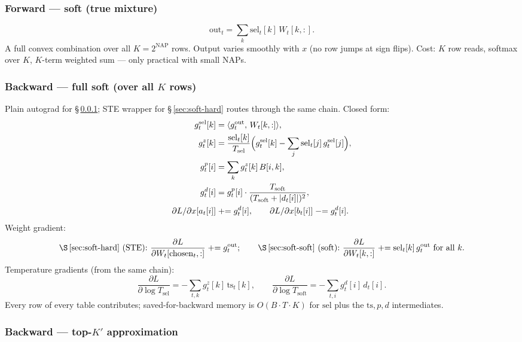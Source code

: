 \documentclass[11pt]{article}
\begin{document}
\subsubsection{Forward --- soft (true mixture)}\label{sec:soft-soft}
\[
  \text{out}_t = \sum_k \mathrm{sel}_t[k]\,W_t[k,:].
\]
A full convex combination over all $K=2^{\mathrm{NAP}}$ rows. Output varies
smoothly with $x$ (no row jumps at sign flips). Cost: $K$ row reads, softmax
over $K$, $K$-term weighted sum --- only practical with small NAPs.

\subsubsection{Backward --- full soft (over all $K$ rows)}\label{sec:soft-bwd}

Plain autograd for \S\,\ref{sec:soft-soft}; STE wrapper for \S\,\ref{sec:soft-hard}
routes through the same chain. Closed form:
\[
\begin{aligned}
  g_t^{\mathrm{sel}}[k] &= \langle g^{\mathrm{out}}_t,\,W_t[k,:]\rangle,\\
  g_t^{z}[k] &= \frac{\mathrm{sel}_t[k]}{T_{\mathrm{sel}}}\Bigl(g_t^{\mathrm{sel}}[k] - \sum_j \mathrm{sel}_t[j]\,g_t^{\mathrm{sel}}[j]\Bigr),\\
  g_t^{p}[i] &= \sum_k g_t^{z}[k]\,B[i,k],\\
  g_t^{d}[i] &= g_t^{p}[i]\cdot \frac{T_{\mathrm{soft}}}{(T_{\mathrm{soft}}+|d_t[i]|)^2},\\
  \partial L/\partial x[a_t[i]] &\mathrel{+}= g_t^{d}[i],\qquad
  \partial L/\partial x[b_t[i]] \mathrel{-}= g_t^{d}[i].
\end{aligned}
\]
Weight gradient:
\[
  \text{\S\,\ref{sec:soft-hard} (STE):}\ \frac{\partial L}{\partial W_t[\mathrm{chosen}_t,:]}\mathrel{+}=g^{\mathrm{out}}_t;\qquad
  \text{\S\,\ref{sec:soft-soft} (soft):}\ \frac{\partial L}{\partial W_t[k,:]}\mathrel{+}=\mathrm{sel}_t[k]\,g^{\mathrm{out}}_t\ \text{for all }k.
\]
Temperature gradients (from the same chain):
\[
  \frac{\partial L}{\partial \log T_{\mathrm{sel}}} = -\sum_{t,k} g_t^{z}[k]\,\mathrm{ts}_t[k],\qquad
  \frac{\partial L}{\partial \log T_{\mathrm{soft}}} = -\sum_{t,i} g_t^{d}[i]\,d_t[i].
\]
Every row of every table contributes; saved-for-backward memory is
$O(B\cdot T\cdot K)$ for $\mathrm{sel}$ plus the $\mathrm{ts},p,d$ intermediates.

\subsubsection{Backward --- top-$K'$ approximation}\label{sec:soft-topk}
\end{document}
